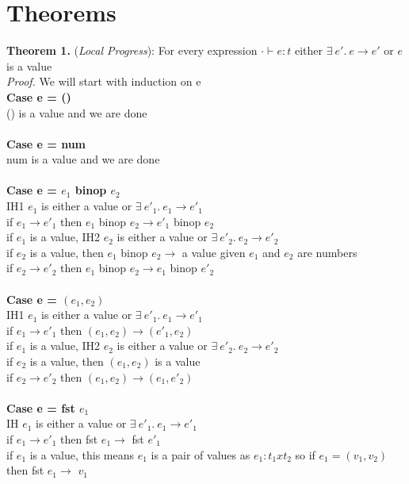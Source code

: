 \documentclass{article}
\begin{document}
\section{Theorems}
\textbf{Theorem 1.} (\textit{Local Progress}): For every expression $\cdot \vdash e : t$ either $  \exists \ e'.\ e \to e'$  or $e$ is a value
  \\
\textit{Proof.} We will start with induction on e \\
\textbf{Case e = ()} \\
() is a value and we are done \\ \\
\textbf{Case e = num} \\
num is a value and we are done \\ \\
\textbf{Case e = $e_1$ binop $e_2$} \\
IH1 $e_1$ is either a value or $  \exists \ e'_1.\ e_1 \to e'_1 $ \\
if $e_1 \to e'_1$ then $e_1$ binop $e_2 \to e'_1$ binop $e_2$ \\
if $e_1$ is a value, IH2 $e_2$ is either a value or $  \exists \ e'_2.\ e_2 \to e'_2 $ \\
if $e_2$ is a value, then $e_1$ binop $e_2 \to$ a value given $e_1$ and $e_2$ are numbers \\
if $e_2 \to e'_2$ then $e_1$ binop $e_2 \to e_1$ binop $e'_2$ \\ \\
\textbf{Case e = $(e_1,e_2)$} \\
IH1 $e_1$ is either a value or $  \exists \ e'_1.\ e_1 \to e'_1 $ \\
if $e_1 \to e'_1$ then $(e_1,e_2) \to (e'_1, e_2)$\\
if $e_1$ is a value, IH2 $e_2$ is either a value or $  \exists \ e'_2.\ e_2 \to e'_2 $ \\
if $e_2$ is a value, then $(e_1,e_2)$ is a value \\
if $e_2 \to e'_2$ then $(e_1,e_2) \to (e_1,e'_2)$ \\ \\
\textbf{Case e = fst $e_1$} \\
IH $e_1$ is either a value or $  \exists \ e'_1.\ e_1 \to e'_1 $ \\
if $e_1 \to e'_1$ then fst $e_1 \to$ fst $e'_1$\\
if $e_1$ is a value, this means $e_1$ is a pair of values as $e_1: t_1 x t_2$
 so if $e_1 = (v_1, v_2)$ then fst $e_1 \to$ $v_1$\\ \\
\end{document}
